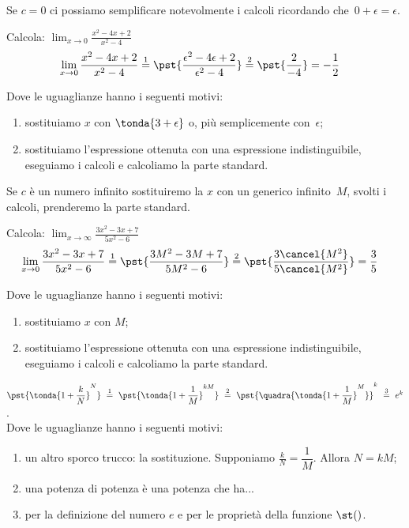 Se $c=0$ ci possiamo semplificare notevolmente i calcoli ricordando 
che~\(0 + \epsilon = \epsilon\).

\begin{esempio}
Calcola: \quad 
  \(\displaystyle \lim_{x \rightarrow 0} \frac{x^2-4x+2}{x^2-4}\)
\begin{align*}
\lim_{x \rightarrow 0} \frac{x^2-4x+2}{x^2-4} & \stackrel{1}{=} 
  \pst{\frac{\epsilon^2-4\epsilon+2}{\epsilon^2-4}} \stackrel{2}{=}  
  \pst{\frac{2}{-4}} = -\frac{1}{2}
\end{align*}

Dove le uguaglianze hanno i seguenti motivi:
\begin{enumerate} [nosep]
 \item sostituiamo $x$ con \(\tonda{3+\epsilon}\) o, più semplicemente 
   con~\(\epsilon\);
 \item sostituiamo l'espressione ottenuta con una espressione 
   indistinguibile, eseguiamo i calcoli e calcoliamo la parte standard.
\end{enumerate}
\end{esempio}

Se $c$ è un numero infinito sostituiremo la $x$ con un generico 
infinito~$M$, svolti i calcoli, prenderemo la parte standard.

\begin{esempio}
Calcola: \quad 
  \(\displaystyle \lim_{x \rightarrow \infty} \frac{3x^2-3x+7}{5x^2-6}\)
\begin{align*}
\lim_{x \rightarrow 0} \frac{3x^2-3x+7}{5x^2-6} & \stackrel{1}{=} 
  \pst{\frac{3M^2-3M+7}{5M^2-6}} \stackrel{2}{=}  
  \pst{\frac{3\cancel{M^2}}{5\cancel{M^2}}} = \frac{3}{5}
\end{align*}

Dove le uguaglianze hanno i seguenti motivi:
\begin{enumerate} [nosep]
 \item sostituiamo $x$ con \(M\);
 \item sostituiamo l'espressione ottenuta con una espressione 
   indistinguibile, eseguiamo i calcoli e calcoliamo la parte standard.
\end{enumerate}
\end{esempio}

\begin{esempio}
\(\pst{\tonda{1+\dfrac{k}{N}}^N}
~ \stackrel{1}{=} ~  
\pst{\tonda{1+\dfrac{1}{M}}^{kM}}
~ \stackrel{2}{=} ~
\pst{\quadra{\tonda{1+\dfrac{1}{M}}^M}}^k
~ \stackrel{3}{=} ~ e^k\).\\

Dove le uguaglianze hanno i seguenti motivi:
\begin{enumerate} [nosep]
 \item un altro sporco trucco: la sostituzione. Supponiamo
$\frac{k}{N}=\dfrac{1}{M}$. Allora $N=kM$;
 \item una potenza di potenza è una potenza che ha...
 \item per la definizione del numero $e$ e per le proprietà della funzione 
$\st()$.
\end{enumerate}
\end{esempio}

